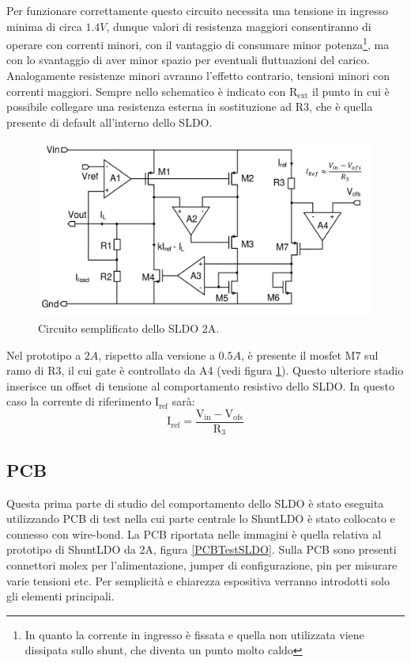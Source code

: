 Per funzionare correttamente questo circuito necessita una tensione in ingresso minima di circa $1.4V$, dunque valori di resistenza maggiori consentiranno di operare con correnti minori, con il vantaggio di consumare minor potenza\footnote{In quanto la corrente in ingresso è fissata e quella non utilizzata viene dissipata sullo shunt, che diventa un punto molto caldo}, ma con lo svantaggio di aver minor spazio per eventuali fluttuazioni del carico. 
Analogamente resistenze minori avranno l'effetto contrario, tensioni minori con correnti maggiori.
Sempre nello schematico è indicato con $\mathrm{R_{ext}}$ il punto in cui è possibile collegare una resistenza esterna in sostituzione ad R3, che è quella presente di default all'interno dello SLDO.
\begin{figure}
\centering
\includegraphics[scale=.3]{Immagini/SLDO2A}
\caption{Circuito semplificato dello SLDO 2A.}
\label{SLDO2A}
\end{figure}
Nel prototipo a $2A$, rispetto alla versione a $0.5A$, è presente il mosfet M7 sul ramo di R3, il cui gate è controllato da A4 (vedi figura \ref{SLDO2A}). Questo ulteriore stadio inserisce un offset di tensione al comportamento resistivo dello SLDO. In questo caso la corrente di riferimento $\mathrm{I_{ref}}$ sarà:
\begin{equation}
\mathrm{I_{ref} = \frac{V_{in} - V_{ofs}}{R_3}}
\end{equation}

\subsection{PCB}
Questa prima parte di studio del comportamento dello SLDO è stato eseguita utilizzando PCB di test nella cui parte centrale lo ShuntLDO è stato collocato e connesso con wire-bond. La PCB riportata nelle immagini è quella relativa al prototipo di ShuntLDO da 2A, figura \ref{PCBTestSLDO}. 
Sulla PCB sono presenti connettori molex per l'alimentazione, jumper di configurazione, pin per misurare varie tensioni etc. Per semplicità e chiarezza espositiva verranno introdotti solo gli elementi principali.

